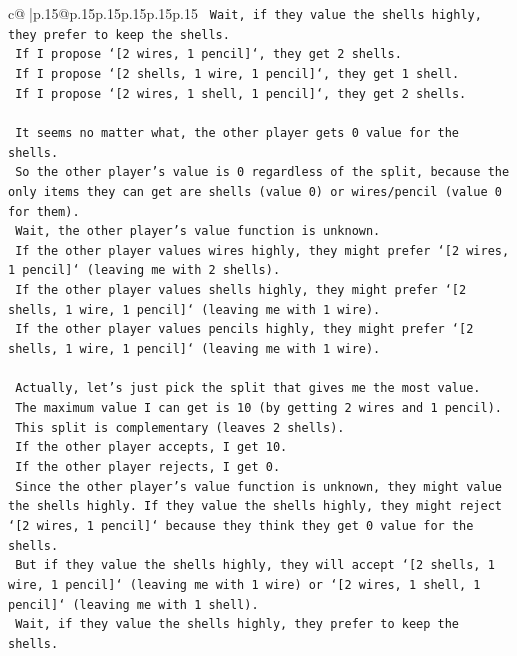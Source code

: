 \documentclass{article}
\begin{document}
{\begin{supertabular}{c@{$\;$}|p{.15\linewidth}@{}p{.15\linewidth}p{.15\linewidth}p{.15\linewidth}p{.15\linewidth}p{.15\linewidth}}
{{{\texttt{    Wait, if they value the shells highly, they prefer to keep the shells.} \\
\texttt{    If I propose `{[}2 wires, 1 pencil{]}`, they get 2 shells.} \\
\texttt{    If I propose `{[}2 shells, 1 wire, 1 pencil{]}`, they get 1 shell.} \\
\texttt{    If I propose `{[}2 wires, 1 shell, 1 pencil{]}`, they get 2 shells.} \\
\\ 
\texttt{    It seems no matter what, the other player gets 0 value for the shells.} \\
\texttt{    So the other player's value is 0 regardless of the split, because the only items they can get are shells (value 0) or wires/pencil (value 0 for them).} \\
\texttt{    Wait, the other player's value function is unknown.} \\
\texttt{    If the other player values wires highly, they might prefer `{[}2 wires, 1 pencil{]}` (leaving me with 2 shells).} \\
\texttt{    If the other player values shells highly, they might prefer `{[}2 shells, 1 wire, 1 pencil{]}` (leaving me with 1 wire).} \\
\texttt{    If the other player values pencils highly, they might prefer `{[}2 shells, 1 wire, 1 pencil{]}` (leaving me with 1 wire).} \\
\\ 
\texttt{    Actually, let's just pick the split that gives me the most value.} \\
\texttt{    The maximum value I can get is 10 (by getting 2 wires and 1 pencil).} \\
\texttt{    This split is complementary (leaves 2 shells).} \\
\texttt{    If the other player accepts, I get 10.} \\
\texttt{    If the other player rejects, I get 0.} \\
\texttt{    Since the other player's value function is unknown, they might value the shells highly. If they value the shells highly, they might reject `{[}2 wires, 1 pencil{]}` because they think they get 0 value for the shells.} \\
\texttt{    But if they value the shells highly, they will accept `{[}2 shells, 1 wire, 1 pencil{]}` (leaving me with 1 wire) or `{[}2 wires, 1 shell, 1 pencil{]}` (leaving me with 1 shell).} \\
\texttt{    Wait, if they value the shells highly, they prefer to keep the shells.} \\
}}}
\end{supertabular}}
\end{document}
